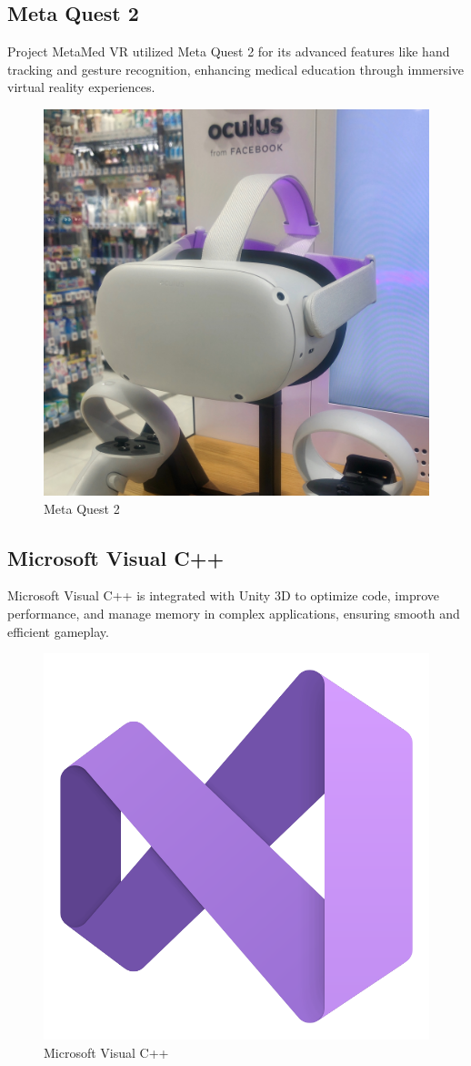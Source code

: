 \subsection{Meta Quest 2}
Project MetaMed VR utilized Meta Quest 2 for its advanced features like hand tracking and gesture recognition, enhancing medical education through immersive virtual reality experiences.
\begin{figure}[h]
	\centering
	\includegraphics[width=0.4\linewidth,height=0.3\linewidth]{Images/metaquest2.png}
	\caption{Meta Quest 2\cite{metaquest}}
\end{figure}
\newpage
\subsection{Microsoft Visual C++}
Microsoft Visual C++ is integrated with Unity 3D to optimize code, improve performance, and manage memory in complex applications, ensuring smooth and efficient gameplay.
\begin{figure}[h]
	\centering
	\includegraphics[width=0.2\linewidth,height=0.2\linewidth]{Images/VS Code.png}
	\caption{Microsoft Visual C++\cite{visual-studio-icon}}
\end{figure}